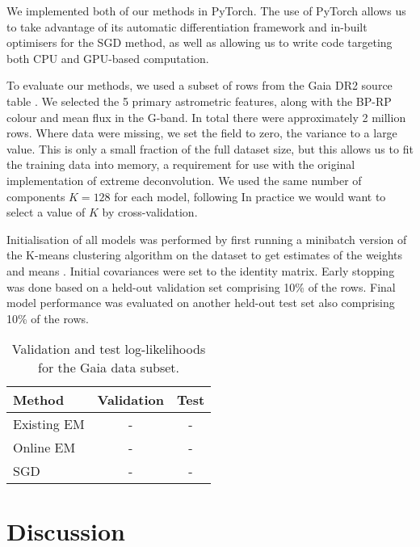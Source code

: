 \documentclass{article}
\begin{document}
We implemented both of our methods in PyTorch.
The use of PyTorch allows us to take advantage of its automatic differentiation framework and in-built optimisers for the SGD method,
as well as allowing us to write code targeting both CPU and GPU-based computation.

To evaluate our methods, we used a subset of rows from the Gaia DR2 source table \cite{brownGaiaDataRelease2018}.
We selected the 5 primary astrometric features, along with the BP-RP colour and mean flux in the G-band.
In total there were approximately 2 million rows.
Where data were missing, we set the field to zero, the variance to a large value.
This is only a small fraction of the full dataset size, but this allows us to fit the training data into memory, a requirement for use with the original implementation of extreme deconvolution.
We used the same number of components $K=128$ for each model, following 
In practice we would want to select a value of $K$ by cross-validation.

Initialisation of all models was performed by first running a minibatch version of the K-means clustering algorithm on the dataset to get estimates of the weights and means \cite{sculleyWebscaleKmeansClustering2010}.
Initial covariances were set to the identity matrix.
Early stopping was done based on a held-out validation set comprising 10\% of the rows.
Final model performance was evaluated on another held-out test set also comprising 10\% of the rows.

\begin{table}
  \caption{Validation and test log-likelihoods for the Gaia data subset.}
  \label{results-table}
  \centering
  \begin{tabular}{lcc}
    \toprule
    Method     & Validation     & Test \\
    \midrule
    Existing EM & -  & -     \\
    Online EM     & - & -      \\
    SGD     & -       & -  \\
    \bottomrule
  \end{tabular}
\end{table}

\section{Discussion}


\end{document}
